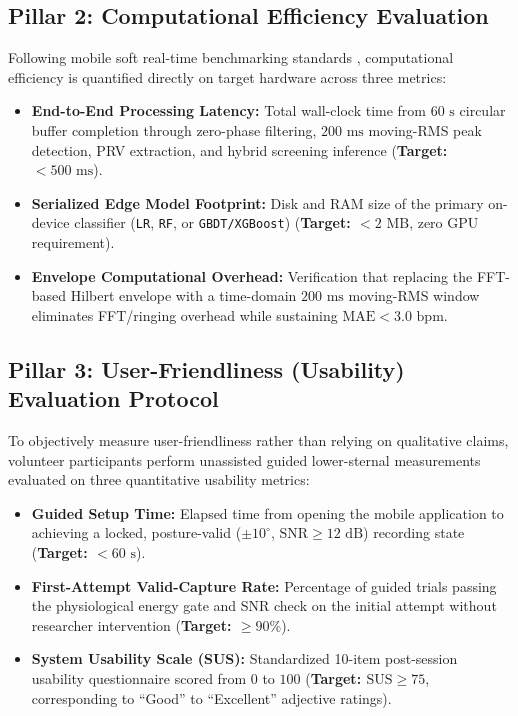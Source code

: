 \subsection{Pillar 2: Computational Efficiency Evaluation}
Following mobile soft real-time benchmarking standards \cite{tsamis2017soft}, computational efficiency is quantified directly on target hardware across three metrics:
\begin{itemize}
	\item \textbf{End-to-End Processing Latency:} Total wall-clock time from $60\text{ s}$ circular buffer completion through zero-phase filtering, $200\text{ ms}$ moving-RMS peak detection, PRV extraction, and hybrid screening inference (\textbf{Target: $< 500\text{ ms}$}).
	\item \textbf{Serialized Edge Model Footprint:} Disk and RAM size of the primary on-device classifier (\texttt{LR}, \texttt{RF}, or \texttt{GBDT/XGBoost}) (\textbf{Target: $< 2\text{ MB}$}, zero GPU requirement).
	\item \textbf{Envelope Computational Overhead:} Verification that replacing the FFT-based Hilbert envelope with a time-domain $200\text{ ms}$ moving-RMS window eliminates FFT/ringing overhead while sustaining $\text{MAE} < 3.0\text{ bpm}$.
\end{itemize}

\subsection{Pillar 3: User-Friendliness (Usability) Evaluation Protocol}
To objectively measure user-friendliness rather than relying on qualitative claims, volunteer participants perform unassisted guided lower-sternal measurements evaluated on three quantitative usability metrics:
\begin{itemize}
	\item \textbf{Guided Setup Time:} Elapsed time from opening the mobile application to achieving a locked, posture-valid ($\pm 10^\circ$, $\text{SNR} \ge 12\text{ dB}$) recording state (\textbf{Target: $< 60\text{ s}$}).
	\item \textbf{First-Attempt Valid-Capture Rate:} Percentage of guided trials passing the physiological energy gate and SNR check on the initial attempt without researcher intervention (\textbf{Target: $\ge 90\%$}).
	\item \textbf{System Usability Scale (SUS):} Standardized 10-item post-session usability questionnaire scored from $0$ to $100$ \cite{brooke1996sus} (\textbf{Target: $\text{SUS} \ge 75$}, corresponding to ``Good'' to ``Excellent'' adjective ratings).
\end{itemize}

